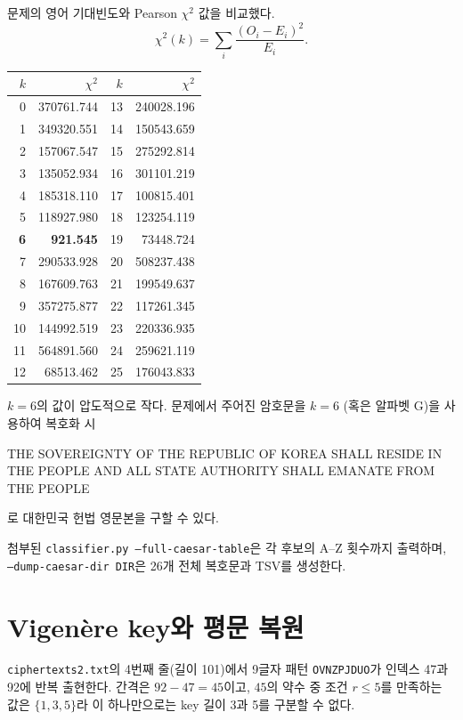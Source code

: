 \documentclass[10pt,a4paper]{article}
\begin{document}
문제의 영어 기대빈도와 Pearson $\chi^2$ 값을 비교했다.
\[
 \chi^2(k)=\sum_i\frac{(O_i-E_i)^2}{E_i}.
\]

\begin{center}
\small
\begin{tabular}{rr@{\hspace{9mm}}rr}
\toprule
$k$ & $\chi^2$ & $k$ & $\chi^2$ \\
\midrule
0 & 370761.744 & 13 & 240028.196 \\
1 & 349320.551 & 14 & 150543.659 \\
2 & 157067.547 & 15 & 275292.814 \\
3 & 135052.934 & 16 & 301101.219 \\
4 & 185318.110 & 17 & 100815.401 \\
5 & 118927.980 & 18 & 123254.119 \\
\textbf{6} & \textbf{921.545} & 19 & 73448.724 \\
7 & 290533.928 & 20 & 508237.438 \\
8 & 167609.763 & 21 & 199549.637 \\
9 & 357275.877 & 22 & 117261.345 \\
10 & 144992.519 & 23 & 220336.935 \\
11 & 564891.560 & 24 & 259621.119 \\
12 & 68513.462 & 25 & 176043.833 \\
\bottomrule
\end{tabular}
\end{center}

$k=6$의 값이 압도적으로 작다.
문제에서 주어진 암호문을 $k=6$ (혹은 알파벳 G)을 사용하여 복호화 시

THE SOVEREIGNTY OF THE REPUBLIC OF KOREA SHALL RESIDE IN THE 
PEOPLE AND ALL STATE AUTHORITY SHALL EMANATE FROM THE PEOPLE

로 대한민국 헌법 영문본을 구할 수 있다.

첨부된 \texttt{classifier.py --full-caesar-table}은 각 후보의
A--Z 횟수까지 출력하며, \texttt{--dump-caesar-dir DIR}은 26개 전체
복호문과 TSV를 생성한다.

\section{Vigenère key와 평문 복원}

\texttt{ciphertexts2.txt}의 4번째 줄(길이 101)에서 9글자 패턴
\texttt{OVNZPJDUO}가 인덱스 47과 92에 반복 출현한다. 간격은
$92-47=45$이고, $45$의 약수 중 조건 $r\le5$를 만족하는 값은
$\{1,3,5\}$라 이 하나만으로는 key 길이 3과 5를 구분할 수 없다.
\end{document}
